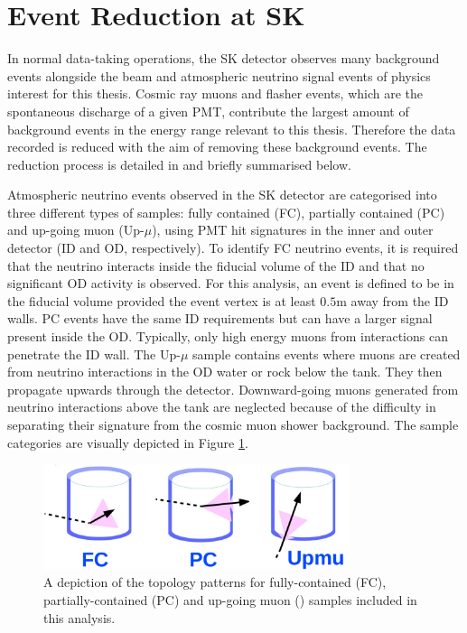 \section{Event Reduction at SK}
\label{sec:Simulations_Reduction}

In normal data-taking operations, the SK detector observes many background events alongside the beam and atmospheric neutrino signal events of physics interest for this thesis. Cosmic ray muons and flasher events, which are the spontaneous discharge of a given PMT, contribute the largest amount of background events in the energy range relevant to this thesis.
Therefore the data recorded is reduced with the aim of removing these background events. The reduction process is detailed in \cite{Ashie_2005, Jiang2019-iw} and briefly summarised below.

Atmospheric neutrino events observed in the SK detector are categorised into three different types of samples: fully contained (FC), partially contained (PC) and up-going muon (Up-$\mu$), using PMT hit signatures in the inner and outer detector (ID and OD, respectively). To identify FC neutrino events, it is required that the neutrino interacts inside the fiducial volume of the ID and that no significant OD activity is observed. For this analysis, an event is defined to be in the fiducial volume provided the event vertex is at least $0.5$m away from the ID walls. PC events have the same ID requirements but can have a larger signal present inside the OD. Typically, only high energy muons from \quickmath{\nu_{\mu}} interactions can penetrate the ID wall. The Up-$\mu$ sample contains events where muons are created from neutrino interactions in the OD water or rock below the tank. They then propagate upwards through the detector. Downward-going muons generated from neutrino interactions above the tank are neglected because of the difficulty in separating their signature from the cosmic muon shower background. The sample categories are visually depicted in Figure \ref{fig:Simulations_AtmosphericSampleTopology}.

\begin{figure}[ht!]
    \centering
    \includegraphics[width=0.8\textwidth]{Figures/Simulations/Atmo_topology.pdf}
    \caption{A depiction of the topology patterns for fully-contained (FC), partially-contained (PC) and up-going muon () samples included in this analysis.}
    \label{fig:Simulations_AtmosphericSampleTopology}
\end{figure}

